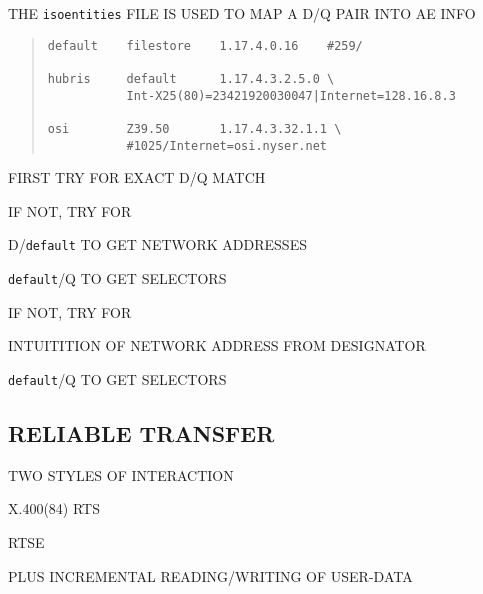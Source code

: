 \begin{bwslide}

\begin{nrtc}
\item	THE \verb"isoentities" FILE IS USED TO MAP A D/Q PAIR INTO AE INFO
\begin{quote}\small\begin{verbatim}
default    filestore    1.17.4.0.16    #259/

hubris     default      1.17.4.3.2.5.0 \
           Int-X25(80)=23421920030047|Internet=128.16.8.3

osi        Z39.50       1.17.4.3.32.1.1 \
           #1025/Internet=osi.nyser.net
\end{verbatim}\end{quote}
\end{nrtc}
\end{bwslide}


\begin{bwslide}

\begin{nrtc}
\item	FIRST TRY FOR EXACT D/Q MATCH

\item	IF NOT, TRY FOR
    \begin{nrtc}
    \item	D/\verb"default" TO GET NETWORK ADDRESSES

    \item	\verb"default"/Q TO GET SELECTORS
    \end{nrtc}

\item	IF NOT, TRY FOR
    \begin{nrtc}
    \item	INTUITITION OF NETWORK ADDRESS FROM DESIGNATOR

    \item	\verb"default"/Q TO GET SELECTORS
    \end{nrtc}
\end{nrtc}
\end{bwslide}


\begin{bwslide}
\part*	{RELIABLE TRANSFER}\bf

\begin{nrtc}
\item	TWO STYLES OF INTERACTION
    \begin{nrtc}
    \item	X.400(84) RTS

    \item	RTSE
    \end{nrtc}

\item	PLUS INCREMENTAL READING/WRITING OF USER-DATA
\end{nrtc}
\end{bwslide}


